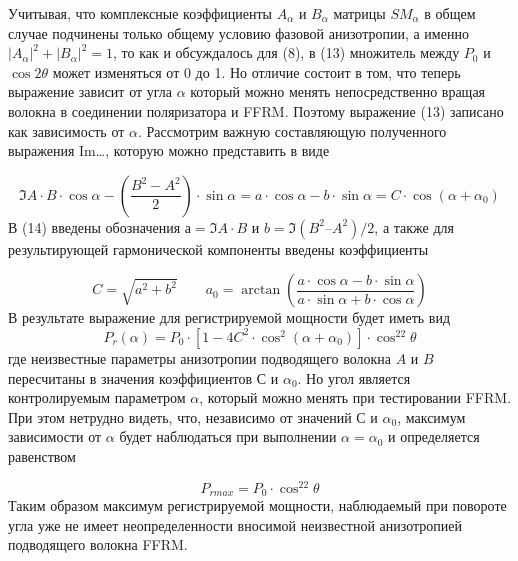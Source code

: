 \documentclass{article}
\begin{document}
Учитывая, что комплексные коэффициенты $A_\alpha$ и $B_\alpha$ матрицы $SM_\alpha$ в общем случае подчинены только общему условию фазовой анизотропии, а именно $|A_\alpha|^2 + |B_\alpha|^2 = 1$, то как и обсуждалось для (8), в (13) множитель  между $P_0$ и $\cos2\theta$ может изменяться от 0 до 1. Но отличие состоит в том, что теперь выражение зависит от угла $\alpha$ который можно менять непосредственно вращая волокна в соединении поляризатора и FFRM. Поэтому выражение (13) записано как зависимость от $\alpha$. Рассмотрим важную составляющую полученного выражения Im{…}, которую можно представить в виде 

\begin{equation}
    \Im{A\cdot B\cdot \cos\alpha-\left( \frac{B^2-A^2}{2} \right)\cdot\sin\alpha} = a\cdot\cos\alpha -b\cdot\sin\alpha=C\cdot\cos(\alpha+\alpha_0)
\end{equation}
В (14) введены обозначения $а = \Im{A\cdot B}$ и $b = \Im{(B^2 – A^2)/2}$, а также для результирующей гармонической компоненты введены коэффициенты

\begin{equation}
    C = \sqrt{a^2+b^2} \qquad a_0 = \arctan\left( \frac{a\cdot\cos\alpha - b\cdot \sin \alpha}{a\cdot\sin\alpha + b\cdot\cos\alpha} \right)
\end{equation}
В результате выражение для регистрируемой мощности будет иметь вид  
\begin{equation}
    P_r(\alpha)=P_0\cdot\left[ 1-4 C^2\cdot\cos^2(\alpha+\alpha_0) \right]\cdot\cos^22\theta
\end{equation}
где неизвестные параметры анизотропии подводящего волокна $A$ и $B$ пересчитаны в значения коэффициентов $С$ и $\alpha_0$. Но угол является контролируемым параметром $\alpha$, который можно менять при тестировании FFRM. При этом нетрудно видеть, что, независимо от значений $С$ и $\alpha_0$, максимум зависимости от $\alpha$ будет наблюдаться при выполнении $\alpha = \alpha_0$ и определяется равенством 

\begin{equation}
    P_{rmax}=P_0\cdot\cos^22\theta
\end{equation}
Таким образом максимум регистрируемой мощности, наблюдаемый при повороте угла уже не имеет неопределенности вносимой неизвестной анизотропией подводящего волокна FFRM.
\end{document}
